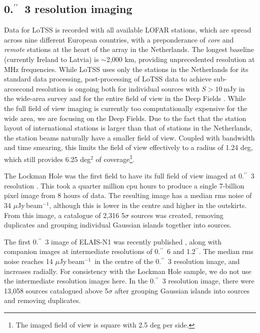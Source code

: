 \documentclass[usenatbib,fleqn,letters]{mnras}
\newcommand{\sarc}{$^{\prime\prime}\!\!$}
\newcommand{\muJybm}{$\mu$Jy$\,$beam$^{-1}$}
\begin{document}
\subsection{0.\sarc\ 3 resolution imaging}
\label{subsec:highres}

Data for LoTSS is recorded with all available LOFAR stations, which are spread across nine different European countries, with a preponderance of \textit{core} and \textit{remote} stations at the heart of the array in the Netherlands. The longest baseline (currently Ireland to Latvia) is $\sim$2,000 km, providing unprecedented resolution at MHz frequencies. While LoTSS uses only the stations in the Netherlands for its standard data processing, post-processing of LoTSS data to achieve sub-arcsecond resolution is ongoing both for individual sources with $S>10\,$mJy in the wide-area survey \citep{morabito_sub-arcsecond_2022} and for the entire field of view in the Deep Fields \citep[][Escott et al., in prep; Bondi et al., in prep]{sweijen_deep_2022,de_jong_into_2024}. While the full field of view imaging is currently too computationally expensive for the wide area, we are focusing on the Deep Fields. Due to the fact that the station layout of international stations is larger than that of stations in the Netherlands, the station beams naturally have a smaller field of view. Coupled with bandwidth and time smearing, this limits the field of view effectively to a radius of 1.24 deg, which still provides 6.25 deg$^2$ of coverage\footnote{The imaged field of view is square with 2.5 deg per side.}. 

The Lockman Hole was the first field to have its full field of view imaged at 0.\sarc\ 3 resolution \citep{sweijen_deep_2022}. This took a quarter million cpu hours to produce a single 7-billion pixel image from 8 hours of data. The resulting image has a median rms noise of 34 \muJybm , although this is lower in the centre and higher in the outskirts. From this image, a catalogue of 2,316 5$\sigma$ sources was created, removing duplicates and grouping individual Gaussian islands together into sources. 

The first 0.\sarc\ 3 image of ELAIS-N1 was recently published \citep{de_jong_into_2024}, along with companion images at intermediate resolutions of 0.\sarc\ 6 and 1.2\sarc . The median rms noise reaches 14 \muJybm\ in the centre of the 0.\sarc\ 3 resolution image, and increases radially. For consistency with the Lockman Hole sample, we do not use the intermediate resolution images here. In the 0.\sarc\ 3 resolution image, there were 13,058 sources catalogued above 5$\sigma$ after grouping Gaussian islands into sources and removing duplicates. 
\end{document}
